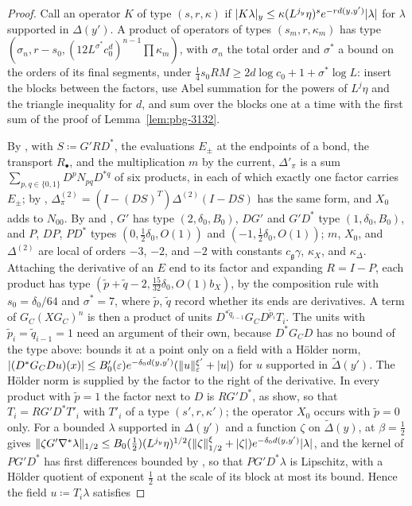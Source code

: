 \documentclass[11pt]{preprint}
\DeclarePairedDelimiter{\abs}{\lvert}{\rvert}
\DeclarePairedDelimiter{\norm}{\lVert}{\rVert}
\numberwithin{equation}{section}
\theoremstyle{definition}
\theoremstyle{remark}
\theoremstyle{plain}
\begin{document}
\begin{proof}
Call an operator $K$ of type $(s, r, \kappa)$ if $\abs{K\lambda}_y \leq \kappa(L^{j_y}\eta)^se^{-rd(y,y')}\abs\lambda$ for $\lambda$ supported in $\Delta(y')$. A product of operators of types $(s_m, r, \kappa_m)$ has type $(\sigma_n, r - s_0, (12L^{\sigma^*}c_0^d)^{n-1}\prod\kappa_m)$, with $\sigma_n$ the total order and $\sigma^*$ a bound on the orders of its final segments, under $\frac14s_0RM \geq 2d\log c_0 + 1 + \sigma^*\log L$: insert the blocks between the factors, use Abel summation for the powers of $L^{j}\eta$ and the triangle inequality for $d$, and sum over the blocks one at a time with the first sum of the proof of Lemma~\ref{lem:pbg-3132}.

By \cite[(3.120)]{BalabanPBG}, with $S \coloneqq G'RD^*$, the evaluations $E_\pm$ at the endpoints of a bond, the transport $R_\bullet$, and the multiplication $m$ by the current, $\Delta'_\pi$ is a sum $\sum_{p,q \in \{0,1\}}D^pN_{pq}D^{*q}$ of six products, in each of which exactly one factor carries $E_\pm$; by \cite[(3.135)]{BalabanPBG}, $\Delta^{(2)}_\pi = (I - (DS)^T)\Delta^{(2)}(I - DS)$ has the same form, and $X_0$ adds to $N_{00}$. By \cite[Theorem~3.4]{BalabanPBG} and \cite[(3.49)]{BalabanPBG}, $G'$ has type $(2, \delta_0, B_0)$, $DG'$ and $G'D^*$ type $(1, \delta_0, B_0)$, and $P$, $DP$, $PD^*$ types $(0, \frac12\delta_0, O(1))$ and $(-1, \frac12\delta_0, O(1))$; $m$, $X_0$, and $\Delta^{(2)}$ are local of orders $-3$, $-2$, and $-2$ with constants $c_{\mathfrak g}\gamma$, $\kappa_X$, and $\kappa_\Delta$. Attaching the derivative of an $E$ end to its factor and expanding $R = I - P$, each product has type $(\tilde p + \tilde q - 2, \frac{15}{32}\delta_0, O(1)b_X)$, by the composition rule with $s_0 = \delta_0/64$ and $\sigma^* = 7$, where $\tilde p$, $\tilde q$ record whether its ends are derivatives. A term of $G_C(XG_C)^n$ is then a product of units $D^{*\tilde q_{i-1}}G_CD^{\tilde p_i}T_i$. The units with $\tilde p_i = \tilde q_{i-1} = 1$ need an argument of their own, because $D^*G_CD$ has no bound of the type above: \cite[(3.44)]{BalabanPBG} bounds it at a point only on a field with a H\"older norm, $\abs{(D^*G_CDu)(x)} \leq B'_0(\varepsilon)e^{-\delta_0d(y,y')}(\norm u^{\xi'}_\varepsilon + \abs u)$ for $u$ supported in $\tilde\Delta(y')$. The H\"older norm is supplied by the factor to the right of the derivative. In every product with $\tilde p = 1$ the factor next to $D$ is $RG'D^*$, as \cite[(3.120), (3.135)]{BalabanPBG} show, so that $T_i = RG'D^*T'_i$ with $T'_i$ of a type $(s', r, \kappa')$; the operator $X_0$ occurs with $\tilde p = 0$ only. For a bounded $\lambda$ supported in $\Delta(y')$ and a function $\zeta$ on $\tilde\Delta(y)$, \cite[(3.43)]{BalabanPBG} at $\beta = \frac12$ gives $\norm{\zeta G'\nabla^*\lambda}_{1/2} \leq B_0(\frac12)(L^{j_y}\eta)^{1/2}(\norm\zeta^\xi_{1/2} + \abs\zeta)e^{-\delta_0d(y,y')}\abs\lambda$, and the kernel of $PG'D^*$ has first differences bounded by \cite[(3.42), (3.49)]{BalabanPBG}, so that $PG'D^*\lambda$ is Lipschitz, with a H\"older quotient of exponent $\frac12$ at the scale of its block at most its bound. Hence the field $u \coloneqq T_i\lambda$ satisfies

\end{proof}
\end{document}
